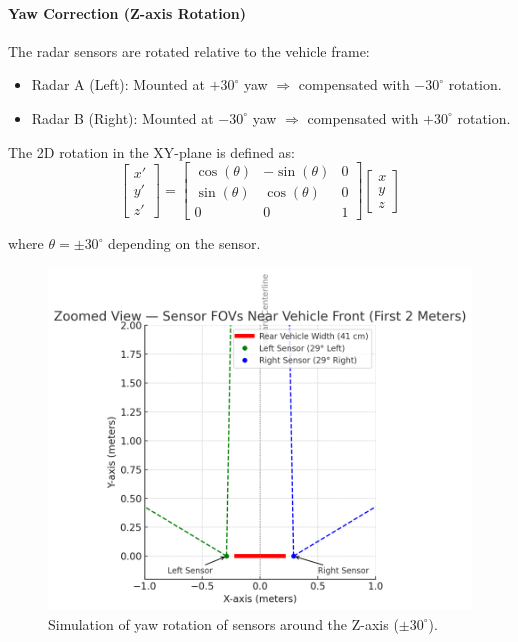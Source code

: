 \vspace{0.5em}
\paragraph{Yaw Correction (Z-axis Rotation)}
The radar sensors are rotated relative to the vehicle frame:

\begin{itemize}
    \item Radar A (Left): Mounted at $+30^\circ$ yaw $\Rightarrow$ compensated with $-30^\circ$ rotation.
    \item Radar B (Right): Mounted at $-30^\circ$ yaw $\Rightarrow$ compensated with $+30^\circ$ rotation.
\end{itemize}

The 2D rotation in the XY-plane is defined as:
\[
\begin{bmatrix}
x' \\
y' \\
z'
\end{bmatrix}
=
\begin{bmatrix}
\cos(\theta) & -\sin(\theta) & 0 \\
\sin(\theta) & \cos(\theta) & 0 \\
0 & 0 & 1
\end{bmatrix}
\begin{bmatrix}
x \\
y \\
z
\end{bmatrix}
\]

where $\theta = \pm30^\circ$ depending on the sensor.

\begin{figure}[!htbp]
    \centering
    \includegraphics[width=0.8\linewidth]{images/SensorsRotation.png}
    \caption{Simulation of yaw rotation of sensors around the Z-axis ($\pm30^\circ$).}
    \label{fig:z_axis_rotation}
\end{figure}

